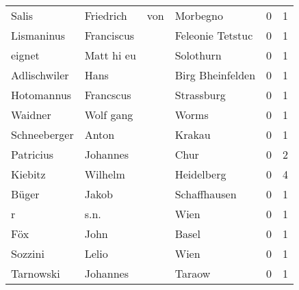 \begin{tabular}{llllrr}
                    Salis &                          Friedrich &         von &                                    Morbegno &          0 &         1 \\
               Lismaninus &                         Franciscus &             &                            Feleonie Tetstuc &          0 &         1 \\
                   eignet &                         Matt hi eu &             &                                   Solothurn &          0 &         1 \\
             Adlischwiler &                               Hans &             &                            Birg Bheinfelden &          0 &         1 \\
               Hotomannus &                          Francscus &             &                                  Strassburg &          0 &         1 \\
                  Waidner &                          Wolf gang &             &                                       Worms &          0 &         1 \\
             Schneeberger &                              Anton &             &                                      Krakau &          0 &         1 \\
                Patricius &                           Johannes &             &                                        Chur &          0 &         2 \\
                  Kiebitz &                            Wilhelm &             &                                  Heidelberg &          0 &         4 \\
                    Büger &                              Jakob &             &                                Schaffhausen &          0 &         1 \\
                        r &                               s.n. &             &                                        Wien &          0 &         1 \\
                      Föx &                               John &             &                                       Basel &          0 &         1 \\
                  Sozzini &                              Lelio &             &                                        Wien &          0 &         1 \\
                Tarnowski &                           Johannes &             &                                      Taraow &          0 &         1 \\

\end{tabular}
